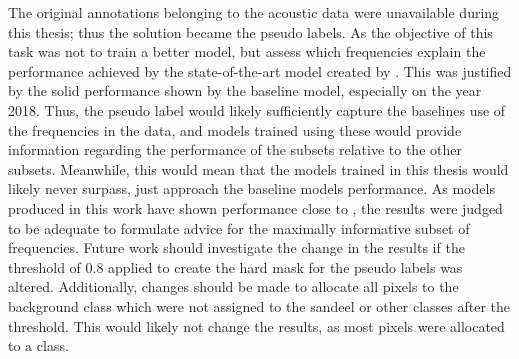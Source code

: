     
    The original annotations belonging to the acoustic data were unavailable during this thesis; thus the solution became the pseudo labels. As the objective of this task was not to train a better model, but assess which frequencies explain the performance achieved by the state-of-the-art model created by \citet{brautaset2020acoustic}. This was justified by the solid performance shown by the baseline model, especially on the year 2018. Thus, the pseudo label would likely sufficiently capture the baselines use of the frequencies in the data, and models trained using these would provide information regarding the performance of the subsets relative to the other subsets.  Meanwhile, this would mean that the models trained in this thesis would likely never surpass, just approach the baseline models performance. As models produced in this work have shown performance close to \citeauthor{brautaset2020acoustic}, the results were judged to be adequate to formulate advice for the maximally informative subset of frequencies. Future work should investigate the change in the results if the threshold of 0.8 applied to create the hard mask for the pseudo labels was altered. Additionally, changes should be made to allocate all pixels to the background class which were not assigned to the sandeel or other classes after the threshold. This would likely not change the results, as most pixels were allocated to a class.

    
    
    
    
    
